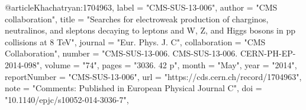 @article{Khachatryan:1704963,
      label          = "CMS-SUS-13-006",
      author        = "{CMS collaboration}",
      title         = "{Searches for electroweak production of charginos,
                       neutralinos, and sleptons decaying to leptons and W, Z, and
                       Higgs bosons in pp collisions at 8 TeV}",
      journal       = "Eur. Phys. J. C",
      collaboration = "CMS Collaboration",
      number        = "CMS-SUS-13-006. CMS-SUS-13-006. CERN-PH-EP-2014-098",
      volume        = "74",
      pages         = "3036. 42 p",
      month         = "May",
      year          = "2014",
      reportNumber  = "CMS-SUS-13-006",
      url           = "https://cds.cern.ch/record/1704963",
      note          = "Comments: Published in European Physical Journal C",
      doi           = "10.1140/epjc/s10052-014-3036-7",
}

